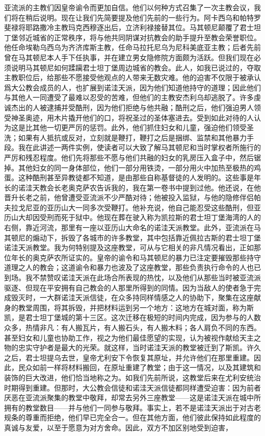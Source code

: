 亚流派的主教们因皇帝谕令而更加自信。他们以何种方式召集了一次主教会议，我们将在稍后说明。现在让我们先简要提及他们先前的一些行为。阿卡西乌和帕特罗斐禄将耶路撒冷主教玛克西穆逐出后，立济利禄接替其位。马其顿尼颠覆了君士坦丁堡邻近城省的正常秩序，将与他共同阴谋对抗教会的助手提升至教会荣誉职位。他任命埃勒乌西乌为齐济库斯主教，任命马拉托尼乌为尼科美底亚主教；后者先前曾在马其顿尼本人手下任执事，并在建立男女隐修院方面颇为活跃。但我们现在必须说明马其顿尼如何蹂躏君士坦丁堡周边城省的教会。此人，如我已说过的，夺取主教职位后，给那些不愿接受他观点的人带来无数灾难。他的迫害不仅限于被承认爲大公教会成员的人，也扩展到诺洼天派，因为他们知道他持守的道理；因此他们与其他人一同遭受了最难以忍受的苦难，但他们的主教安杰利乌却逃脱了。许多虔诚杰出的人被逮捕并受酷刑，因为他们拒绝与他共融；酷刑之后，他们强迫男人领受神圣奥迹，用木片撬开他们的口，将祝圣过的圣体塞进去。受到如此对待的人认为这是比其他一切更严厉的惩罚。此外，他们抓住妇女和儿童，强迫他们领受圣洗；如果有人抵抗或反对，立刻就是鞭打，鞭打之后是捆绑、监禁和其他暴力手段。我在此讲述一两件实例，使读者可以大致了解马其顿尼和当时掌权者所施行的严厉和残忍程度。他们先将那些不愿与他们共融的妇女的乳房压入盒子中，然后锯掉。其他妇女的同一身体部位，他们一部分用铁烫，一部分用火中加热至极热的鸡蛋。这种酷刑甚至异教徒都不知道，是由那些自称基督徒的人发明的。这些事是年长的诺洼天教会长老奥克萨农告诉我的，我在第一卷书中提到过他。他还说，在他晋升长老之前，他曾遭受亚流派不少严酷对待；他被投入监狱，与他的隐修伴侣帕夫拉戈尼亚的亚历山大一同多次受鞭打。他补充说，他自己能忍受这些酷刑，但亚历山大却因受刑而死于狱中。他现在葬在驶入称为凯拉斯的君士坦丁堡海湾的人的右侧，靠近河流，那里有一座以亚历山大命名的诺洼天派教堂。此外，亚流派在马其顿尼的煽动下，拆毁了各城市的许多教堂，其中包括靠近佩拉古斯的君士坦丁堡诺洼天派教堂。我为何特别提及这座教堂，可从与它相关的非凡情况看出，正如那位年长的奥克萨农所证实的。皇帝的谕令和马其顿尼的暴力已注定要摧毁那些持守道理之人的教会；这道谕令和暴力也波及了这座教堂，那些负责执行命令的人也已到场。我不禁赞叹诺洼天派在此场合所表现的热忱，以及他们从那些当时被亚流派驱逐、但现在平安拥有自己教会的人那里所得到的同情。因为当敌人的使者急于完成毁灭时，一大群诺洼天派信徒，在众多持同样情感之人的协助下，聚集在这座献身的教堂周围，将其拆毁，并把材料运到另一个地方：这地方在城对面，称为斯凯，是君士坦丁堡城的第十三区。这次迁移在极短的时间内完成，因为参与的人数众多，热情非凡：有人搬瓦片，有人搬石头，有人搬木料；各人肩负不同的东西。甚至妇女和儿童也协助工作，视之为他们最佳愿望的实现，认为被视作献给天主之物的忠实守护者是最大的光荣。就这样，当时诺洼天派的教堂被迁到了斯凯。许久之后，君士坦提乌去世，皇帝尤利安下令恢复其原址，并允许他们在那里重建。因此，民众如前一样将材料搬回，在原址重建了教堂；由于这一情况，以及其建筑和装饰的巨大改进，他们恰当地称之为。如我们先前所说，这教堂后来在尤利安统治时期得到重建。但那时，大公教会信徒和诺洼天派信徒都同样遭受迫害：因为前者厌恶在亚流派聚集的教堂中敬拜，却常去另外三座教堂——这是诺洼天派在城中所拥有的教堂数目——并与他们一同参与敬拜。事实上，若不是诺洼天派出于对古老规条的尊重而拒绝，他们早已完全合一。但在其他方面，他们彼此保持如此程度的真诚与友爱，以至于愿意为对方舍命。因此，双方不加区别地受到迫害，
